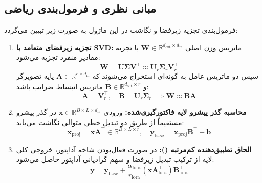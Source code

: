 \subsection{مبانی نظری و فرمول‌بندی ریاضی}
فرمول‌بندی تجزیه زیرفضا و نگاشت در این ماژول به صورت زیر تبیین می‌گردد:
\begin{enumerate}
    \item \textbf{تجزیه زیرفضای متعامد با SVD:}
    ماتریس وزن اصلی $\mathbf{W} \in \mathbb{R}^{d_{\text{out}} \times d_{\text{in}}}$ با تجزیه مقادیر منفرد تجزیه می‌شود:
    \begin{equation}
    \mathbf{W} = \mathbf{U} \boldsymbol{\Sigma} \mathbf{V}^\top \approx \mathbf{U}_r \boldsymbol{\Sigma}_r \mathbf{V}_r^\top
    \end{equation}
    سپس دو ماتریس عامل به گونه‌ای استخراج می‌شوند که $\mathbf{A} \in \mathbb{R}^{r \times d_{\text{in}}}$ پایه تصویرگر و $\mathbf{B} \in \mathbb{R}^{d_{\text{out}} \times r}$ ماتریس انبساط ضرایب باشد:
    \begin{equation}
    \mathbf{A} = \mathbf{V}_r^\top, \quad \mathbf{B} = \mathbf{U}_r \boldsymbol{\Sigma}_r \implies \mathbf{W} \approx \mathbf{B} \mathbf{A}
    \end{equation}
    \item \textbf{محاسبه گذر پیشرو لایه فاکتورگیری‌شده:}
    ورودی $\mathbf{x} \in \mathbb{R}^{B \times L \times d_{\text{in}}}$ در گذر پیشرو مستقیماً از طریق دو تبدیل خطی متوالی نگاشت می‌یابد:
    \begin{equation}
    \mathbf{x}_{\text{proj}} = \mathbf{x} \mathbf{A}^\top \in \mathbb{R}^{B \times L \times r}, \quad \mathbf{y}_{\text{base}} = \mathbf{x}_{\text{proj}} \mathbf{B}^\top + \mathbf{b}
    \end{equation}
    \item \textbf{الحاق تطبیق‌دهنده کم‌مرتبه ():}
    در صورت فعال‌بودن شاخه آداپتور، خروجی کلی لایه از ترکیب تبدیل زیرفضا و سهم گرادیانی آداپتور حاصل می‌شود:
    \begin{equation}
    \mathbf{y} = \mathbf{y}_{\text{base}} + \frac{\alpha_{\text{lora}}}{r_{\text{lora}}} (\mathbf{x} \mathbf{A}_{\text{lora}}^\top) \mathbf{B}_{\text{lora}}^\top
    \end{equation}
\end{enumerate}

